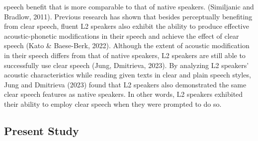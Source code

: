 \documentclass[
  man,
  floatsintext,
  longtable,
  nolmodern,
  notxfonts,
  notimes,
  colorlinks=true,linkcolor=blue,citecolor=blue,urlcolor=blue]{apa7}
\begin{document}
speech benefit that is more comparable to that of native speakers.
(Similjanic and Bradlow, 2011). Previous research has shown that besides
perceptually benefiting from clear speech, fluent L2 speakers also
exhibit the ability to produce effective acoustic-phonetic modifications
in their speech and achieve the effect of clear speech (Kato \&
Baese-Berk, 2022). Although the extent of acoustic modification in their
speech differs from that of native speakers, L2 speakers are still able
to successfully use clear speech (Jung, Dmitrieva, 2023). By analyzing
L2 speakers' acoustic characteristics while reading given texts in clear
and plain speech styles, Jung and Dmitrieva (2023) found that L2
speakers also demonstrated the same clear speech features as native
speakers. In other words, L2 speakers exhibited their ability to employ
clear speech when they were prompted to do so.

\subsection{Present Study}\label{sec-present-study}
\end{document}
